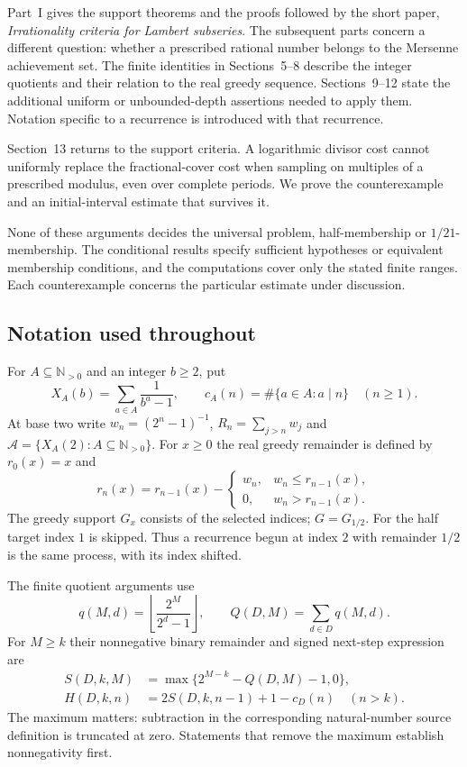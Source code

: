 \documentclass[11pt]{article}
\theoremstyle{plain}
\theoremstyle{definition}
\theoremstyle{remark}
\begin{document}
Part~I gives the support theorems and the proofs followed by the short
paper, \emph{Irrationality criteria for Lambert subseries}.
The subsequent parts concern a different question: whether a prescribed
rational number belongs to the Mersenne achievement set. The finite
identities in Sections~5--8 describe the integer quotients and their
relation to the real greedy sequence. Sections~9--12 state the additional
uniform or unbounded-depth assertions needed to apply them. Notation
specific to a recurrence is introduced with that recurrence.

Section~13 returns to the support criteria. A logarithmic divisor cost
cannot uniformly replace the fractional-cover cost when sampling on
multiples of a prescribed modulus, even over complete periods. We prove
the counterexample and an initial-interval estimate that survives it.

None of these arguments decides the universal problem, half-membership
or $1/21$-membership. The conditional results specify sufficient
hypotheses or equivalent membership conditions, and the computations
cover only the stated finite ranges. Each counterexample concerns the
particular estimate under discussion.

\subsection*{Notation used throughout}
For $A\subseteq\mathbb N_{>0}$ and an integer $b\ge2$, put
\[
 X_A(b)=\sum_{a\in A}\frac1{b^a-1},\qquad
 c_A(n)=\#\{a\in A:a\mid n\}\quad(n\ge1).
\]
At base two write $w_n=(2^n-1)^{-1}$, $R_n=\sum_{j>n}w_j$ and
$\mathcal A=\{X_A(2):A\subseteq\mathbb N_{>0}\}$.  For $x\ge0$ the
real greedy remainder is defined by $r_0(x)=x$ and
\[
 r_n(x)=r_{n-1}(x)-\begin{cases}
 w_n,&w_n\le r_{n-1}(x),\\
 0,&w_n>r_{n-1}(x).
 \end{cases}
\]
The greedy support $G_x$ consists of the selected indices; $G=G_{1/2}$.
For the half target index $1$ is skipped.  Thus a recurrence begun at index
$2$ with remainder $1/2$ is the same process, with its index shifted.

The finite quotient arguments use
\[
 q(M,d)=\left\lfloor\frac{2^M}{2^d-1}\right\rfloor,\qquad
 Q(D,M)=\sum_{d\in D}q(M,d).
\]
For $M\ge k$ their nonnegative binary remainder and signed next-step
expression are
\[
 \begin{aligned}
 S(D,k,M)&=\max\{2^{M-k}-Q(D,M)-1,0\},\\
 H(D,k,n)&=2S(D,k,n-1)+1-c_D(n)\quad(n>k).
 \end{aligned}
\]
The maximum matters: subtraction in the corresponding natural-number
source definition is truncated at zero.  Statements that remove the
maximum establish nonnegativity first.
\end{document}
